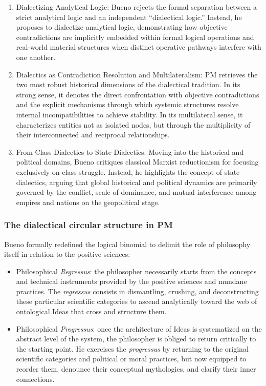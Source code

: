 \documentclass[11pt, a4paper]{article}
\begin{document}
\begin{enumerate}
    \item {Dialectizing Analytical Logic:} Bueno rejects the formal separation between a strict analytical logic and an independent ``dialectical logic.'' Instead, he proposes to dialectize analytical logic, demonstrating how objective contradictions are implicitly embedded within formal logical operations and real-world material structures when distinct operative pathways interfere with one another.
    \item {Dialectics as Contradiction Resolution and Multilateralism:} PM retrieves the two most robust historical dimensions of the dialectical tradition. In its strong sense, it denotes the direct confrontation with objective contradictions and the explicit mechanisms through which systemic structures resolve internal incompatibilities to achieve stability. In its multilateral sense, it characterizes entities not as isolated nodes, but through the multiplicity of their interconnected and reciprocal relationships.
    \item {From Class Dialectics to State Dialectics:} Moving into the historical and political domains, Bueno critiques classical Marxist reductionism for focusing exclusively on class struggle. Instead, he highlights the concept of state dialectics, arguing that global historical and political dynamics are primarily governed by the conflict, scale of dominance, and mutual interference among empires and nations on the geopolitical stage.
\end{enumerate}

\subsubsection*{The dialectical circular structure in PM} \label{sec:pmregprog}
Bueno formally redefined the logical binomial to delimit the role of philosophy itself in relation to the positive sciences:
\begin{itemize}
	\item \textrm{Philosophical \textit{Regressus}:} the philosopher necessarily starts from the concepts and technical instruments provided by the positive sciences and mundane practices. The \textit{regressus} consists in dismantling, crushing, and deconstructing these particular scientific categories to ascend analytically toward the web of ontological \textrm{Ideas} that cross and structure them.
	\item \textrm{Philosophical \textit{Progressus}:} once the architecture of Ideas is systematized on the abstract level of the system, the philosopher is obliged to return critically to the starting point. He exercises the \textit{progressus} by returning to the original scientific categories and political or moral practices, but now equipped to reorder them, denounce their conceptual mythologies, and clarify their inner connections.
\end{itemize}
\end{document}
